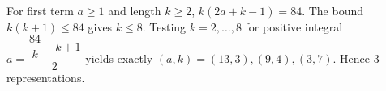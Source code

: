 For first term $ a\ge1 $ and length $ k\ge2 $, $ k(2a+k-1)=84 $. The bound $ k(k+1)\le84 $ gives $ k\le8 $. Testing $ k=2,\ldots,8 $ for positive integral $ a=\dfrac{\dfrac{84}{k}-k+1}{2}$ yields exactly $(a,k)=(13,3),(9,4),(3,7)$. Hence $\boxed3 $ representations.
